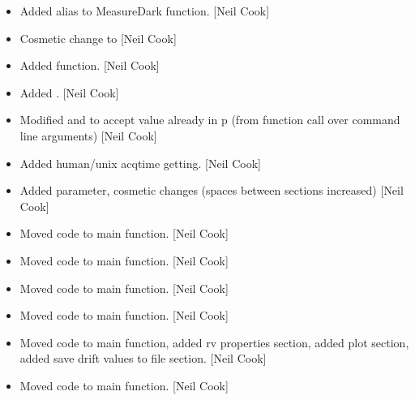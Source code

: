 \documentclass[a4paper,10pt,english]{report}
\begin{document}
\begin{itemize}
\item {} 
Added alias to MeasureDark function. {[}Neil Cook{]}

\item {} 
Cosmetic change to  {[}Neil Cook{]}

\item {} 
Added  function. {[}Neil Cook{]}

\item {} 
Added . {[}Neil Cook{]}

\item {} 
Modified  and  to accept value already in
p (from function call over command line arguments) {[}Neil Cook{]}

\item {} 
Added human/unix acqtime getting. {[}Neil Cook{]}

\item {} 
Added  parameter, cosmetic changes (spaces between
sections increased) {[}Neil Cook{]}

\item {} 
Moved  code to main function. {[}Neil Cook{]}

\item {} 
Moved  code to main function. {[}Neil Cook{]}

\item {} 
Moved  code to main function. {[}Neil Cook{]}

\item {} 
Moved  code to main function. {[}Neil Cook{]}

\item {} 
Moved  code to main function, added rv properties section,
added plot section, added save drift values to file section. {[}Neil
Cook{]}

\item {} 
Moved  code to main function. {[}Neil Cook{]}

\end{itemize}
\end{document}
